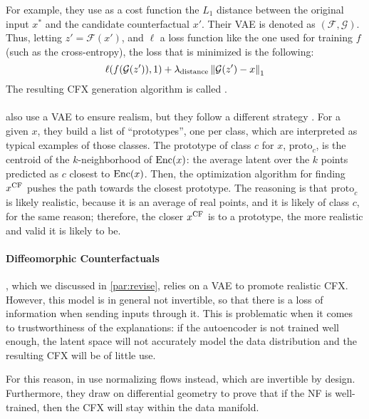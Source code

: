 \documentclass[../main.tex]{subfiles}
\begin{document}
For example, they use as a cost function the $L_1$ distance between the original input $x^{*}$ and the candidate counterfactual $x'$.
Their VAE is denoted as $(\mathcal{F}, \mathcal{G})$.
Thus, letting $z' = \mathcal{F}(x')$, and $\ell$ a loss function like the one used for training $f$ (such as the cross-entropy), the loss that is minimized is the following:
\begin{equation}
	\ell(f(\mathcal{G}(z')), 1)
	+ \lambda_\text{distance} \left\lVert\mathcal{G}(z') - x\right\rVert_1
\end{equation}
The resulting CFX generation algorithm is called \revise{} \cite{joshiRealistic2019}.

\paragraph{}

\citeauthor{vanlooverenInterpretable2021} also use a VAE to ensure realism, but they follow a different strategy \cite{vanlooverenInterpretable2021}.
For a given $x$, they build a list of ``prototypes'', one per class, which are interpreted as typical examples of those classes.
The prototype of class $c$ for $x$, $\text{proto}_c$, is the centroid of the $k$-neighborhood of $\operatorname{Enc}(x)$: the average latent over the $k$ points predicted as $c$ closest to $\operatorname{Enc}(x)$.
Then, the optimization algorithm for finding $x^\mathrm{CF}$ pushes the path towards the closest prototype.
The reasoning is that $\text{proto}_c$ is likely realistic, because it is an average of real points, and it is likely of class $c$, for the same reason; therefore, the closer $x^\mathrm{CF}$ is to a prototype, the more realistic and valid it is likely to be.

\paragraph{Diffeomorphic Counterfactuals}
\label{previous_work:diffeo}

\revise{}, which we discussed in \autoref{par:revise}, relies on a VAE to promote realistic CFX.
However, this model is in general not invertible, so that there is a loss of information when sending inputs through it.
This is problematic when it comes to trustworthiness of the explanations: if the autoencoder is not trained well enough, the latent space will not accurately
model the data distribution and the resulting CFX will be of little use.

For this reason, in \cite{dombrowskiDiffeomorphic2021} \citeauthor{dombrowskiDiffeomorphic2021} use normalizing flows instead, which are invertible by design.
Furthermore, they draw on differential geometry to prove that if the NF is well-trained, then the CFX will stay within the data manifold.
\end{document}
